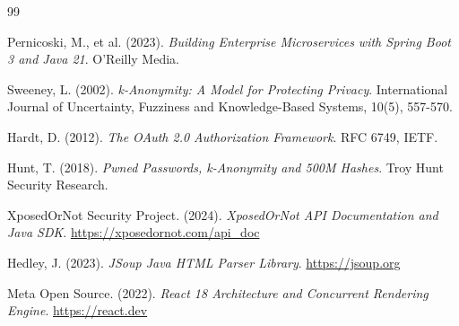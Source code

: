 \documentclass[12pt,a4paper,oneside]{report}
\begin{document}
\clearpage
{}
\begin{thebibliography}{99}

Pernicoski, M., et al. (2023). \textit{Building Enterprise Microservices with Spring Boot 3 and Java 21}. O'Reilly Media.

Sweeney, L. (2002). \textit{k-Anonymity: A Model for Protecting Privacy}. International Journal of Uncertainty, Fuzziness and Knowledge-Based Systems, 10(5), 557-570.

Hardt, D. (2012). \textit{The OAuth 2.0 Authorization Framework}. RFC 6749, IETF.

Hunt, T. (2018). \textit{Pwned Passwords, k-Anonymity and 500M Hashes}. Troy Hunt Security Research.

XposedOrNot Security Project. (2024). \textit{XposedOrNot API Documentation and Java SDK}. \url{https://xposedornot.com/api_doc}

Hedley, J. (2023). \textit{JSoup Java HTML Parser Library}. \url{https://jsoup.org}

Meta Open Source. (2022). \textit{React 18 Architecture and Concurrent Rendering Engine}. \url{https://react.dev}

\end{thebibliography}
\end{document}
